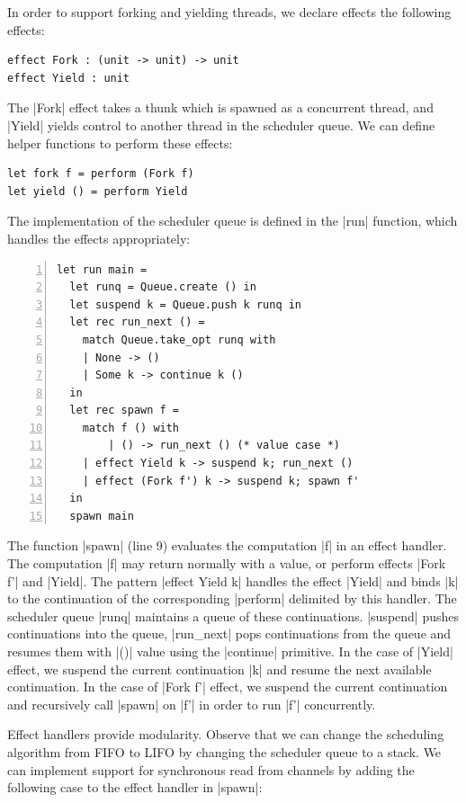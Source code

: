 \documentclass[sigplan,screen]{acmart}
\begin{document}
In order to support forking and yielding threads, we declare effects the
following effects:

\begin{lstlisting}
effect Fork : (unit -> unit) -> unit
effect Yield : unit
\end{lstlisting}

The |Fork| effect takes a thunk which is spawned as a concurrent thread, and
|Yield| yields control to another thread in the scheduler queue. We can define
helper functions to perform these effects:

\begin{lstlisting}
let fork f = perform (Fork f)
let yield () = perform Yield
\end{lstlisting}

The implementation of the scheduler queue is defined in the |run| function,
which handles the effects appropriately:

\begin{lstlisting}[numbers=left]
let run main =
  let runq = Queue.create () in
  let suspend k = Queue.push k runq in
  let rec run_next () =
    match Queue.take_opt runq with
    | None -> ()
    | Some k -> continue k ()
  in
  let rec spawn f =
    match f () with
		| () -> run_next () (* value case *)
    | effect Yield k -> suspend k; run_next ()
    | effect (Fork f') k -> suspend k; spawn f'
  in
  spawn main
\end{lstlisting}

The function |spawn| (line 9) evaluates the computation |f| in an effect
handler. The computation |f| may return normally with a value, or perform
effects |Fork f'| and |Yield|. The pattern |effect Yield k| handles the effect
|Yield| and binds |k| to the continuation of the corresponding |perform|
delimited by this handler. The scheduler queue |runq| maintains a queue of
these continuations. |suspend| pushes continuations into the queue, |run_next|
pops continuations from the queue and resumes them with |()| value using the
|continue| primitive. In the case of |Yield| effect, we suspend the current
continuation |k| and resume the next available continuation. In the case of
|Fork f'| effect, we suspend the current continuation and recursively call
|spawn| on |f'| in order to run |f'| concurrently.

Effect handlers provide modularity. Observe that we can change the scheduling
algorithm from FIFO to LIFO by changing the scheduler queue to a stack. We can
implement support for synchronous read from channels by adding the following
case to the effect handler in |spawn|:
\end{document}
